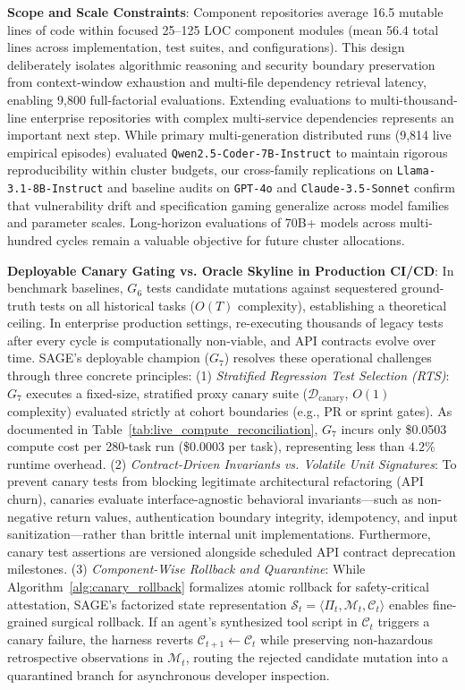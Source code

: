 \documentclass[conference]{IEEEtran}
\begin{document}
\textbf{Scope and Scale Constraints}:
Component repositories average 16.5 mutable lines of code within focused 25--125 LOC component modules (mean 56.4 total lines across implementation, test suites, and configurations). This design deliberately isolates algorithmic reasoning and security boundary preservation from context-window exhaustion and multi-file dependency retrieval latency, enabling 9,800 full-factorial evaluations. Extending evaluations to multi-thousand-line enterprise repositories with complex multi-service dependencies represents an important next step. While primary multi-generation distributed runs (9,814 live empirical episodes) evaluated \texttt{Qwen2.5-Coder-7B-Instruct} to maintain rigorous reproducibility within cluster budgets, our cross-family replications on \texttt{Llama-3.1-8B-Instruct} and baseline audits on \texttt{GPT-4o} and \texttt{Claude-3.5-Sonnet} confirm that vulnerability drift and specification gaming generalize across model families and parameter scales. Long-horizon evaluations of 70B+ models across multi-hundred cycles remain a valuable objective for future cluster allocations.

\textbf{Deployable Canary Gating vs. Oracle Skyline in Production CI/CD}:
In benchmark baselines, $G_6$ tests candidate mutations against sequestered ground-truth tests on all historical tasks ($O(T)$ complexity), establishing a theoretical ceiling. In enterprise production settings, re-executing thousands of legacy tests after every cycle is computationally non-viable, and API contracts evolve over time. SAGE's deployable champion ($G_7$) resolves these operational challenges through three concrete principles:
(1) \textit{Stratified Regression Test Selection (RTS)}: $G_7$ executes a fixed-size, stratified proxy canary suite ($\mathcal{D}_{\text{canary}}$, $O(1)$ complexity) evaluated strictly at cohort boundaries (e.g., PR or sprint gates). As documented in Table~\ref{tab:live_compute_reconciliation}, $G_7$ incurs only \$0.0503 compute cost per 280-task run (\$0.0003 per task), representing less than $4.2\%$ runtime overhead.
(2) \textit{Contract-Driven Invariants vs. Volatile Unit Signatures}: To prevent canary tests from blocking legitimate architectural refactoring (API churn), canaries evaluate interface-agnostic behavioral invariants—such as non-negative return values, authentication boundary integrity, idempotency, and input sanitization—rather than brittle internal unit implementations. Furthermore, canary test assertions are versioned alongside scheduled API contract deprecation milestones.
(3) \textit{Component-Wise Rollback and Quarantine}: While Algorithm~\ref{alg:canary_rollback} formalizes atomic rollback for safety-critical attestation, SAGE's factorized state representation $\mathcal{S}_t = \langle \Pi_t, \mathcal{M}_t, \mathcal{C}_t \rangle$ enables fine-grained surgical rollback. If an agent's synthesized tool script in $\mathcal{C}_t$ triggers a canary failure, the harness reverts $\mathcal{C}_{t+1} \leftarrow \mathcal{C}_t$ while preserving non-hazardous retrospective observations in $\mathcal{M}_t$, routing the rejected candidate mutation into a quarantined branch for asynchronous developer inspection.
\end{document}
